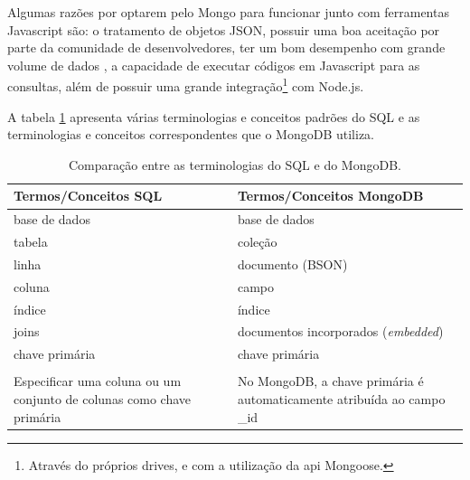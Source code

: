 Algumas razões por optarem pelo Mongo para funcionar junto com ferramentas Javascript são: o tratamento de objetos JSON,  possuir uma boa aceitação por parte da comunidade de desenvolvedores\cite{dbEng}, ter um bom desempenho com grande volume de dados \cite{compBds}, a capacidade de executar códigos em Javascript  para as consultas, além de possuir uma grande integração\footnote{Através do próprios drives, e com a utilização da api Mongoose.} com Node.js.   

A tabela \ref{fig:Tabela comparando as terminologias do SQL e do MongoDB} apresenta várias terminologias e conceitos padrões do SQL e as terminologias e conceitos correspondentes que o MongoDB utiliza.

\begin{table}[ht]
\begin{tabular}{|l|l|}
\hline
\rowcolor[HTML]{CFCFCF} 
Termos/Conceitos SQL & Termos/Conceitos MongoDB \\ \hline
base de dados        & base de dados          \\ \hline
tabela               & coleção                \\ \hline
linha                & documento (BSON)       \\ \hline
coluna               & campo                  \\ \hline
índice               & índice                 \\ \hline
joins                & documentos incorporados (\textit{embedded})                                            \\ \hline
chave primária       & chave primária         \\ \hline
                     &                        \\
\multirow{-2}{19em}{Especificar uma coluna ou um conjunto   de colunas como chave primária} & \multirow{-2}{19em}{No MongoDB, a chave primária é  automaticamente atribuída ao campo \_id} \\ \hline
\end{tabular}
\caption{Comparação entre as terminologias do SQL e do MongoDB. \cite{MongoDbSQL}}
\label{fig:Tabela comparando as terminologias do SQL e do MongoDB}
\end{table}


